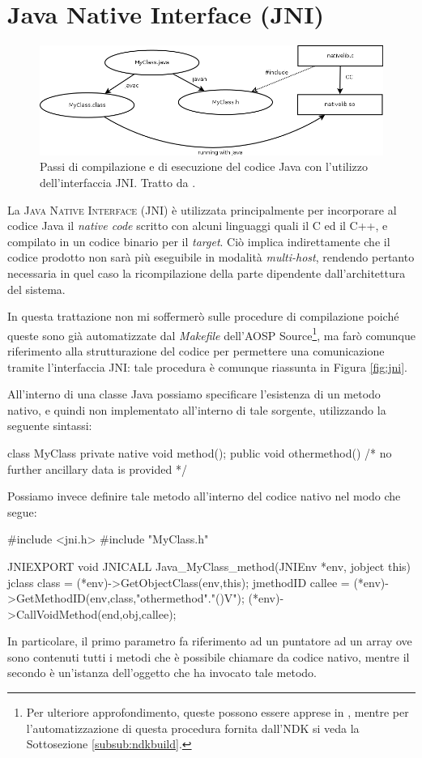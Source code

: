 \section{Java Native Interface (JNI)}
\begin{figure}[thp]
\centering
\includegraphics[scale=0.5]{img/jni/jni.png}
\caption{Passi di compilazione e di esecuzione del codice Java con l'utilizzo
dell'interfaccia JNI. Tratto da \parencite{libro:jni}.}
\label{fig:jni}
\end{figure}
La \textsc{Java Native Interface} (JNI) è utilizzata principalmente per incorporare al codice Java 
il \textit{native code} scritto con alcuni linguaggi quali il C ed il C++, e compilato
in un codice binario per il \textit{target}. Ciò implica indirettamente che
il codice prodotto non sarà più eseguibile in modalità \textit{multi-host}, rendendo
pertanto necessaria in quel caso la ricompilazione della parte dipendente 
dall'architettura del sistema. 

In questa trattazione non mi soffermerò sulle procedure di compilazione poiché 
queste sono già automatizzate dal \textit{Makefile} dell'AOSP Source\footnote{Per 
ulteriore approfondimento, queste possono essere apprese in \parencite[11-17]{libro:jni},
mentre per l'automatizzazione di questa procedura fornita dall'NDK si veda
la Sottosezione \vref{subsub:ndkbuild}.},
ma farò comunque riferimento alla strutturazione del codice per permettere una
comunicazione tramite l'interfaccia JNI: tale procedura è comunque riassunta in Figura \vref{fig:jni}.


All'interno di una classe Java possiamo specificare l'esistenza di un metodo
nativo, e quindi non implementato all'interno di tale sorgente, utilizzando
la seguente sintassi:
\begin{java}
class MyClass {
	private native void method();
	public void othermethod() {
		/* no further ancillary data is provided */
	}
}
\end{java}
Possiamo invece definire tale metodo all'interno del codice nativo nel modo che
segue:
\begin{clang}
#include <jni.h>
#include "MyClass.h"

JNIEXPORT void JNICALL Java_MyClass_method(JNIEnv *env, jobject this) {
	jclass class = (*env)->GetObjectClass(env,this);
	jmethodID callee = (*env)->GetMethodID(env,class,"othermethod"."()V");
	(*env)->CallVoidMethod(end,obj,callee);
}
\end{clang}
In particolare, il primo parametro fa riferimento ad un puntatore ad un array
ove sono contenuti tutti i metodi che è possibile chiamare da codice nativo, mentre 
il secondo è un'istanza dell'oggetto che ha invocato tale metodo.

